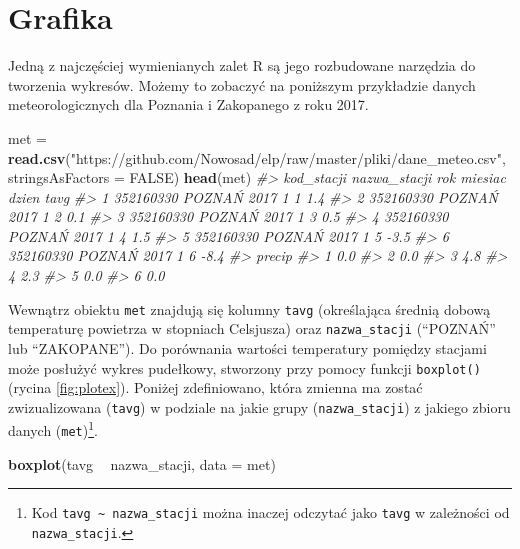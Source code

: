\documentclass[paper=6in:9in,pagesize=pdftex,headinclude=on,footinclude=on,10pt]{scrbook}
\newenvironment{Shaded}{\begin{snugshade}}{\end{snugshade}}
\newcommand{\CommentTok}[1]{\textcolor[rgb]{0.56,0.35,0.01}{\textit{#1}}}
\newcommand{\DataTypeTok}[1]{\textcolor[rgb]{0.13,0.29,0.53}{#1}}
\newcommand{\KeywordTok}[1]{\textcolor[rgb]{0.13,0.29,0.53}{\textbf{#1}}}
\newcommand{\NormalTok}[1]{#1}
\newcommand{\OperatorTok}[1]{\textcolor[rgb]{0.81,0.36,0.00}{\textbf{#1}}}
\newcommand{\OtherTok}[1]{\textcolor[rgb]{0.56,0.35,0.01}{#1}}
\newcommand{\StringTok}[1]{\textcolor[rgb]{0.31,0.60,0.02}{#1}}
\begin{document}
\hypertarget{grafika}{%
\section{Grafika}\label{grafika}}

Jedną z najczęściej wymienianych zalet R są jego rozbudowane narzędzia do tworzenia wykresów.
Możemy to zobaczyć na poniższym przykładzie danych meteorologicznych dla Poznania i Zakopanego z roku 2017.

\begin{Shaded}
\begin{Highlighting}[]
\NormalTok{met =}\StringTok{ }\KeywordTok{read.csv}\NormalTok{(}\StringTok{"https://github.com/Nowosad/elp/raw/master/pliki/dane_meteo.csv"}\NormalTok{,}
             \DataTypeTok{stringsAsFactors =} \OtherTok{FALSE}\NormalTok{)}
\KeywordTok{head}\NormalTok{(met)}
\CommentTok{#>   kod_stacji nazwa_stacji  rok miesiac dzien tavg}
\CommentTok{#> 1  352160330       POZNAŃ 2017       1     1  1.4}
\CommentTok{#> 2  352160330       POZNAŃ 2017       1     2  0.1}
\CommentTok{#> 3  352160330       POZNAŃ 2017       1     3  0.5}
\CommentTok{#> 4  352160330       POZNAŃ 2017       1     4  1.5}
\CommentTok{#> 5  352160330       POZNAŃ 2017       1     5 -3.5}
\CommentTok{#> 6  352160330       POZNAŃ 2017       1     6 -8.4}
\CommentTok{#>   precip}
\CommentTok{#> 1    0.0}
\CommentTok{#> 2    0.0}
\CommentTok{#> 3    4.8}
\CommentTok{#> 4    2.3}
\CommentTok{#> 5    0.0}
\CommentTok{#> 6    0.0}
\end{Highlighting}
\end{Shaded}

Wewnątrz obiektu \texttt{met} znajdują się kolumny \texttt{tavg} (określająca średnią dobową temperaturę powietrza w stopniach Celsjusza) oraz \texttt{nazwa\_stacji} (``POZNAŃ'' lub ``ZAKOPANE'').
Do porównania wartości temperatury pomiędzy stacjami może posłużyć wykres pudełkowy, stworzony przy pomocy funkcji \texttt{boxplot()} (rycina \ref{fig:plotex}).
Poniżej zdefiniowano, która zmienna ma zostać zwizualizowana (\texttt{tavg}) w podziale na jakie grupy (\texttt{nazwa\_stacji}) z jakiego zbioru danych (\texttt{met})\footnote{Kod \texttt{tavg\ \textasciitilde{}\ nazwa\_stacji} można inaczej odczytać jako \texttt{tavg} w zależności od \texttt{nazwa\_stacji}.}.

\begin{Shaded}
\begin{Highlighting}[]
\KeywordTok{boxplot}\NormalTok{(tavg }\OperatorTok{~}\StringTok{ }\NormalTok{nazwa_stacji, }\DataTypeTok{data =}\NormalTok{ met)}
\end{Highlighting}
\end{Shaded}
\end{document}
